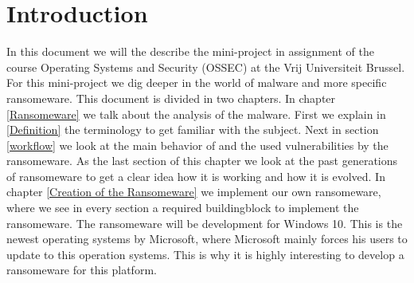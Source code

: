 \chapter{Introduction}\label{introduction}

In this document we will the describe the mini-project in assignment of the course Operating Systems and Security (OSSEC) at the Vrij Universiteit Brussel. For this mini-project we dig deeper in the world of malware and more specific ransomeware. This document is divided in two chapters. In chapter \ref{Ransomeware} we talk about the analysis of the malware. First we explain in \ref{Definition} the terminology to get familiar with the subject. Next in section \ref{workflow} we look at the main behavior of and the used vulnerabilities by the ransomeware. As the  last section of this chapter we look at the past generations of ransomeware to get a clear idea how it is working and how it is evolved. In chapter \ref{Creation of the Ransomeware} we implement our own ransomeware, where we see in every section a required buildingblock to implement the ransomeware. The ransomeware will be development for Windows 10. This is the newest operating systems by Microsoft, where Microsoft mainly forces his users to update to this operation systems. This is why it is highly interesting to develop a ransomeware for this platform.

